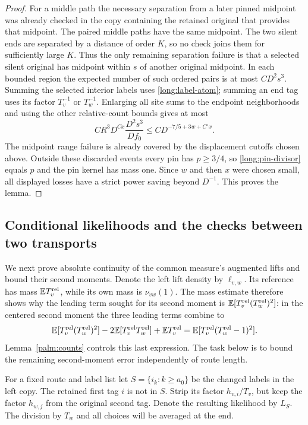\begin{proof}
For a middle path the necessary separation from a later pinned midpoint
was already checked in the copy containing the retained original that
provides that midpoint.  The paired middle paths have the same midpoint.
The two silent ends are separated by a distance of order $K$, so no check
joins them for sufficiently large $K$.  Thus the only remaining separation
failure is that a selected silent original has midpoint within $s$ of
another original midpoint.  In each bounded region the expected number
of such ordered pairs is at most $CD^2s^3$.  Summing the selected interior
labels uses \eqref{long:label-atom}; summing an end tag uses its factor
$T_v^{-1}$ or $T_w^{-1}$.  Enlarging all site sums to the endpoint
neighborhoods and using the other relative-count bounds gives at most
\[
 C R^3D^{Cx}\frac{D^2s^3}{Df_0}
       \le C D^{-7/5+3w+C'x}.
\]
The midpoint range failure is already covered by the displacement cutoffs
chosen above.  Outside these discarded events every pin has $p\ge3/4$,
so \eqref{long:pin-divisor} equals $p$ and the pin kernel has mass one.
Since $w$ and then $x$ were chosen small, all displayed losses have a
strict power saving beyond $D^{-1}$.  This proves the lemma.
\end{proof}

\subsection{Conditional likelihoods and the checks between two transports}

We next prove absolute continuity of the common measure's augmented lifts
and bound their second moments.  Denote the left lift density by
$\ell_{v,w}$.  Its reference has mass $\mathbb E T_v^{\rm rel}$, while its
own mass is $\nu_{vw}(1)$.  The mass estimate therefore shows why the
leading term sought for its second moment is
$\mathbb E[T_v^{\rm rel}(T_w^{\rm rel})^2]$: in the centered second moment
the three leading terms combine to
\[
 \mathbb E[T_v^{\rm rel}(T_w^{\rm rel})^2]
 -2\mathbb E[T_v^{\rm rel}T_w^{\rm rel}]+\mathbb E T_v^{\rm rel}
 =\mathbb E[T_v^{\rm rel}(T_w^{\rm rel}-1)^2].
\]
Lemma~\ref{palm:counts} controls this last expression.  The task below is
to bound the remaining second-moment error independently of route length.

For a fixed route and label
list let $S=\{i_k:k\ge a_0\}$ be the changed labels in the left copy.
The retained first tag $i$ is not in $S$.  Strip its factor $h_{v,i}/T_v$,
but keep the factor $h_{w,j}$ from the original second tag.  Denote the
resulting likelihood by $L_S$.  The division by $T_w$ and all choices
will be averaged at the end.


